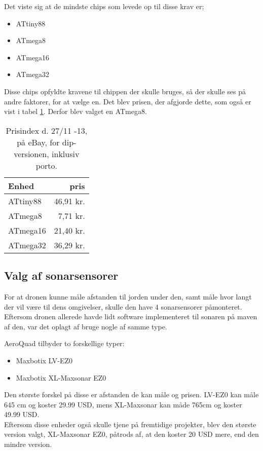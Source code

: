\documentclass[Main]{subfiles}
\begin{document}
Det viste sig at de mindste chips som levede op til disse krav er;

\begin{itemize}
\item ATtiny88
\item ATmega8
\item ATmega16
\item ATmega32
\end{itemize}


Disse chips opfyldte kravene til chippen der skulle bruges, så der skulle ses på andre faktorer, for at vælge en. 
Det blev prisen, der afgjorde dette, som også er vist i tabel \ref{Tab:prisIndex}.
Derfor blev valget en ATmega8.

\begin{table}[H]
\centering
	\begin{tabular}{l r}\hline
	Enhed & pris \\ \hline
	ATtiny88 & 46,91 kr.\\
	ATmega8  & 7,71 kr.\\
	ATmega16 & 21,40 kr.\\
	ATmega32 & 36,29 kr. \\ \hline
	\end{tabular}
\caption{Prisindex d. 27/11 -13, på eBay, for dip-versionen, inklusiv porto.}
\label{Tab:prisIndex}
\end{table}



\subsection{Valg af sonarsensorer}
For at dronen kunne måle afstanden til jorden under den, samt måle hvor langt der vil være til dens omgivelser, skulle den have 4 sonarsensorer påmonteret.
Eftersom dronen allerede havde lidt software implementeret til sonaren på maven af den, var det oplagt af bruge nogle af samme type.


AeroQuad tilbyder to forskellige typer: 
\begin{itemize}
\item Maxbotix LV-EZ0 \cite{LV-EZ0}
\item Maxbotix XL-Maxsonar EZ0 \cite{XL-EZ0}
\end{itemize}

Den største forskel på disse er afstanden de kan måle og prisen.
LV-EZ0 kan måle 645 cm og koster 29.99 USD, mens XL-Maxsonar kan måde 765cm og koster 49.99 USD.
\\
Eftersom disse enheder også skulle tjene på fremtidige projekter, blev den største version valgt, XL-Maxsonar EZ0, påtrods af, at den koster 20 USD mere, end den mindre version.
\end{document}
